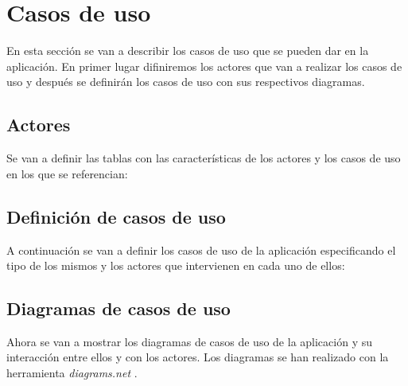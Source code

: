 

\section{Casos de uso}
En esta sección se van a describir los casos de uso que se pueden dar
en la aplicación. En primer lugar difiniremos los actores que van a realizar
los casos de uso y después se definirán los casos de uso con sus respectivos
diagramas.

\subsection{Actores}
Se van a definir las tablas con las características de los actores y los casos
de uso en los que se referencian:



\subsection{Definición de casos de uso}
A continuación se van a definir los casos de uso de la aplicación especificando
el tipo de los mismos y los actores que intervienen en cada uno de ellos:



\newpage
\subsection{Diagramas de casos de uso}
Ahora se van a mostrar los diagramas de casos de uso de la aplicación y su interacción
entre ellos y con los actores. Los diagramas se han realizado con la herramienta
\textit{diagrams.net} \cite{diagramsnet}.

